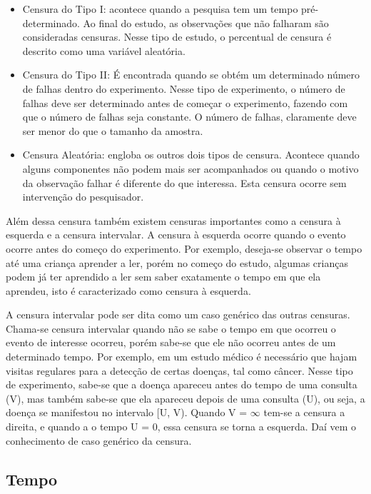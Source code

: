 \begin{itemize}
	\item Censura do Tipo I: acontece quando a pesquisa tem um tempo pré-determinado. Ao final do estudo, as observações que não falharam são consideradas censuras. Nesse tipo de estudo, o percentual de censura é descrito como uma variável aleatória.
	
	\item Censura do Tipo II: É encontrada quando se obtém um determinado número de falhas dentro do experimento. Nesse tipo de experimento, o número de falhas deve ser determinado antes de começar o experimento, fazendo com que o número de falhas seja constante. O número de falhas, claramente deve ser menor do que o tamanho da amostra.
	
	\item Censura Aleatória: engloba os outros dois tipos de censura. Acontece quando alguns componentes não podem mais ser acompanhados ou quando o motivo da observação falhar é diferente do que interessa. Esta censura ocorre sem intervenção do pesquisador.

\end{itemize}

Além dessa censura também existem censuras importantes como a censura à esquerda e a censura intervalar. A censura à esquerda ocorre quando o evento ocorre antes do começo do experimento. Por exemplo, deseja-se observar o tempo até uma criança aprender a ler, porém no começo do estudo, algumas crianças podem já ter aprendido a ler sem saber exatamente o tempo em que ela aprendeu, isto é caracterizado como censura à esquerda. %

A censura intervalar pode ser dita como um caso genérico das outras censuras. Chama-se censura intervalar quando não se sabe o tempo em que ocorreu o evento de interesse
ocorreu, porém sabe-se que ele não ocorreu antes de um determinado tempo. Por exemplo, em um estudo médico é necessário que hajam visitas regulares para a detecção de certas doenças, tal como câncer. Nesse tipo de experimento, sabe-se que a doença apareceu antes do tempo de uma consulta (V), mas também sabe-se que ela apareceu depois de uma consulta (U), ou seja, a doença se manifestou no intervalo [U, V). Quando V = $\infty$
tem-se a censura a direita, e quando a o tempo U = 0, essa censura se torna a esquerda. Daí vem o conhecimento de caso genérico da censura.

\subsection*{Tempo}

